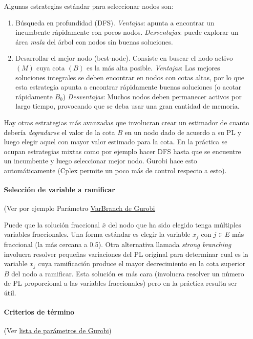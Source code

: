     Algunas estrategias estándar para seleccionar nodos son:
    \begin{enumerate}
    	\item Búsqueda en profundidad (DFS). 
    	\emph{Ventajas}: apunta a encontrar un incumbente rápidamente con pocos nodos. 
    	\emph{Desventajas}: puede explorar un área \emph{mala} del árbol con nodos sin buenas soluciones.
    	\item Desarrollar el mejor nodo (best-node). Consiste en buscar el nodo activo $(M)$ cuya cota $(B)$ es la más alta posible. 
    	\emph{Ventajas}: Las mejores soluciones integrales se deben encontrar en nodos con cotas altas, por lo que esta estrategia apunta a encontrar rápidamente buenas soluciones (o acotar rápidamente $B_0$)
    	\emph{Desventajas}: Muchos nodos deben permanecer activos por largo tiempo, provocando que se deba usar una gran cantidad de memoria.
    \end{enumerate}
    Hay otras estrategias más avanzadas que involucran crear un estimador de cuanto debería \emph{degradarse} el valor de la cota $B$ en un nodo dado de acuerdo a su PL y luego elegir aquel con mayor valor estimado para la cota. En la práctica se ocupan estrategias mixtas como por ejemplo hacer DFS hasta que se encuentre un incumbente y luego seleccionar mejor nodo. Gurobi hace esto automáticamente (Cplex permite un poco más de control respecto a esto).
    
    
    
    \paragraph{Selección de variable a ramificar} (Ver por ejemplo Parámetro \href{https://www.gurobi.com/documentation/9.0/refman/varbranch.html#parameter:VarBranch}{VarBranch de Gurobi}
    
    Puede que la solución fraccional $\bar{x}$ del nodo que ha sido elegido tenga múltiples variables fraccionales. Una forma estándar es elegir la variable $x_j$ con $j\in E$ más fraccional (la más cercana a 0.5).
    Otra alternativa llamada \emph{strong branching} involucra resolver pequeñas variaciones del PL original para determinar cual es la variable $x_j$ cuya ramificación produce el mayor decrecimiento en la cota superior $B$ del nodo a ramificar. Esta solución es más cara (involucra resolver un número de PL proporcional a las variables fraccionales) pero en la práctica resulta ser útil.
    
    \paragraph{Criterios de término}(Ver \href{https://www.gurobi.com/documentation/9.0/refman/parameters.html}{lista de parámetros de Gurobi})
    
